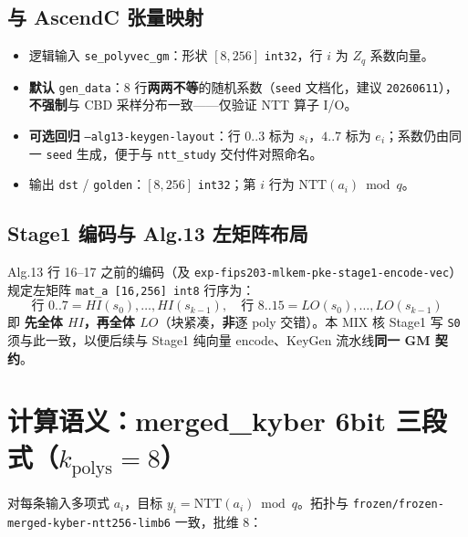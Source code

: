\documentclass[UTF8,a4paper,11pt]{ctexart}
\begin{document}
\subsection{与 AscendC 张量映射}
\begin{itemize}
  \item 逻辑输入 \texttt{se\_polyvec\_gm}：形状 $[8,256]$ \texttt{int32}，行 $i$ 为 $Z_q$ 系数向量。
  \item \textbf{默认} \texttt{gen\_data}：8 行\textbf{两两不等}的随机系数（\texttt{seed} 文档化，建议 \texttt{20260611}），\textbf{不强制}与 CBD 采样分布一致——仅验证 NTT 算子 I/O。
  \item \textbf{可选回归} \texttt{--alg13-keygen-layout}：行 $0..3$ 标为 $s_i$，$4..7$ 标为 $e_i$；系数仍由同一 \texttt{seed} 生成，便于与 \texttt{ntt\_study} 交付件对照命名。
  \item 输出 \texttt{dst} / \texttt{golden}：$[8,256]$ \texttt{int32}；第 $i$ 行为 $\mathrm{NTT}(a_i)\bmod q$。
\end{itemize}

\subsection{Stage1 编码与 Alg.13 左矩阵布局}
Alg.13 行 16–17 之前的编码（及 \texttt{exp-fips203-mlkem-pke-stage1-encode-vec}）规定左矩阵 \texttt{mat\_a [16,256] int8} 行序为：
\[
  \text{行 }0..7 = HI(s_0),\ldots,HI(s_{k-1}),\quad
  \text{行 }8..15 = LO(s_0),\ldots,LO(s_{k-1})
\]
即 \textbf{先全体 $HI$，再全体 $LO$}（块紧凑，\textbf{非}逐 poly 交错）。本 MIX 核 Stage1 写 \texttt{S0} 须与此一致，以便后续与 Stage1 纯向量 encode、KeyGen 流水线\textbf{同一 GM 契约}。

\section{计算语义：merged\_kyber 6bit 三段式（$k_{\mathrm{polys}}{=}8$）}

对每条输入多项式 $a_i$，目标 $y_i=\mathrm{NTT}(a_i)\bmod q$。拓扑与 \texttt{frozen/frozen-merged-kyber-ntt256-limb6} 一致，批维 $8$：
\end{document}
